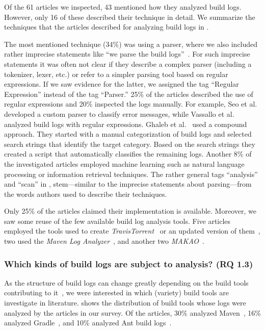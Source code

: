 Of the 61 articles we inspected, 43 mentioned how they analyzed
build logs.
However, only 16 of these described their technique in detail.
We summarize the techniques that the articles
described for analyzing build logs in .

The most mentioned technique (34\%) was using a parser, where we also
included
rather imprecise statements like ``we parse the build
logs''~\cite{rahman2018impact}.
For such imprecise statements it was often not clear if they describe
a complex parser (including a tokenizer, lexer, etc.) or refer to a
simpler parsing tool based on regular expressions.
If we saw evidence for the latter, we assigned the tag
``Regular Expression'' instead of the tag ``Parser.''
25\% of the articles described the use of regular expressions and 20\%
inspected the logs manually.
For example,
Seo et al.~\cite{seo2014programmers} developed a custom
parser to classify error messages, while Vassallo et
al.~\cite{vassallo2017a-tale} analyzed build logs with regular
expressions.
Ghaleb et al.~\cite{ghaleb2019studying} used a compound approach.
They started with a manual categorization of build logs and selected
search strings that identify the target category.
Based on the search strings they created a script that automatically
classifies the remaining logs.
Another 8\% of the investigated articles
employed machine learning such as natural language
processing or information retrieval techniques.
The rather general tags ``analysis'' and ``scan'' in
, stem---similar to the imprecise
statements about parsing---from the
words authors used to describe their techniques.


Only 25\% of the articles claimed their implementation is available.
Moreover, we
saw some reuse of the few available build log analysis tools.
Five articles employed the tools used to create
\emph{TravisTorrent}~\cite{beller2017travistorrent,beller2017oops,
orellana2017differences,zhao2018comparing} or
an updated version of them~\cite{rott2019empirische,
shi2018evaluating}, two used the
\emph{Maven Log Analyzer}~\cite{macho2018automatically,gallaba2018noise},
and
another two
\emph{MAKAO}~\cite{wen2018blimp,adams2007design,adams2007makao}.

\subsubsection{Which kinds of build logs are subject to
  analysis? (RQ 1.3)}
As the structure of build logs can change greatly depending on the
build tools contributing to it~\cite{staahl2014modeling},
we were interested in which (variety) build tools are
investigate in literature.
 shows the distribution of
build tools whose logs were analyzed by the articles in our survey.
Of the articles, 30\% analyzed
Maven~\cite{maven2019website},
16\% analyzed Gradle~\cite{gradle2020website},
and 10\% analyzed Ant build logs~\cite{ant2020website}.

